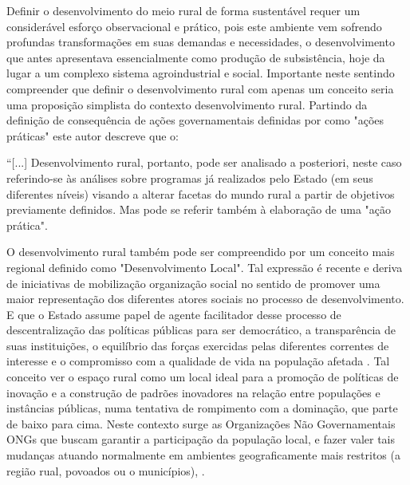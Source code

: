 Definir o desenvolvimento do meio rural de forma sustentável requer um considerável esforço observacional e prático, pois este ambiente vem sofrendo profundas transformações em suas demandas e necessidades, o desenvolvimento que antes apresentava essencialmente como produção de subsistência, hoje da lugar a um complexo sistema agroindustrial \cite{bastos_determinantes_2018} e social. Importante neste sentindo compreender que definir o desenvolvimento rural com apenas um conceito seria uma proposição simplista do contexto desenvolvimento rural. Partindo da definição de consequência de ações governamentais definidas por  como "ações práticas" este autor descreve que o:

\begin{citacao}
“[...] Desenvolvimento rural, portanto, pode ser analisado a posteriori, neste caso referindo-se às análises sobre programas já realizados pelo Estado (em seus diferentes níveis) visando a alterar facetas do mundo rural a partir de objetivos previamente definidos. Mas pode se referir também à elaboração de uma "ação prática".
\end{citacao}

O desenvolvimento rural também pode ser compreendido por um conceito mais regional definido como "Desenvolvimento Local". Tal expressão é recente e deriva de iniciativas de mobilização organização social no sentido de promover uma maior representação dos diferentes atores sociais no processo de desenvolvimento. E que o Estado assume papel de agente facilitador desse processo de descentralização das políticas públicas  para ser democrático, a transparência de suas instituições, o equilíbrio das forças exercidas pelas diferentes correntes de interesse e o compromisso com a qualidade de vida na população afetada \cite{campanhola_diretrizes_2000}. Tal conceito ver o espaço rural como um local ideal para a promoção de políticas de inovação e a construção de padrões inovadores na relação entre populações e instâncias públicas, numa tentativa de rompimento com a dominação, que parte de baixo para cima. Neste contexto surge as Organizações Não Governamentais ONGs que buscam garantir a participação da população local, e fazer valer tais mudanças atuando normalmente em ambientes geograficamente mais restritos (a região rual, povoados ou o municípios), \cite{assis_agricultura_2005, campanhola_diretrizes_2000}.

